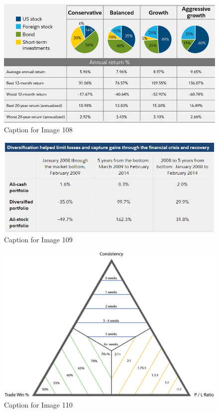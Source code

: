 \documentclass{article}
\begin{document}
\vspace{10pt}

\begin{figure}[!htb]
    \centering
    \includegraphics[width=\textwidth]{imgs/108.png}
    \caption{Caption for Image 108}
\end{figure}

\vspace{10pt}

\begin{figure}[!htb]
    \centering
    \includegraphics[width=\textwidth]{imgs/109.png}
    \caption{Caption for Image 109}
\end{figure}

\vspace{10pt}

\begin{figure}[!htb]
    \centering
    \includegraphics[width=\textwidth]{imgs/110.png}
    \caption{Caption for Image 110}
\end{figure}
\end{document}
